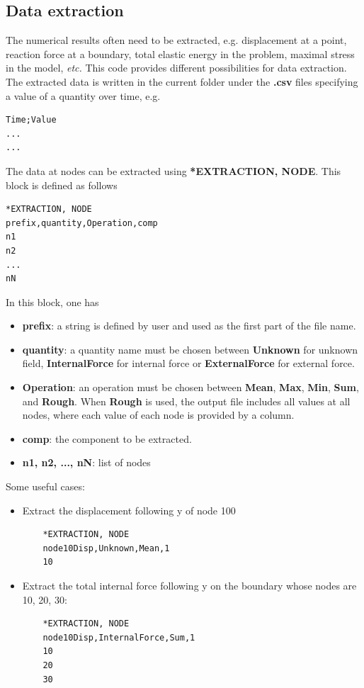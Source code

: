 \documentclass[oneside,11pt,times]{book}
\begin{document}
\subsection{Data extraction}

The numerical results often need to be extracted, e.g. displacement at a point, reaction force at a boundary, total elastic energy in the problem, maximal stress in the model, \emph{etc.} This code provides different possibilities for data extraction. The extracted data is written in the current folder under the \textbf{.csv} files specifying a value of a quantity over time, e.g.
\begin{lstlisting}
Time;Value
...
...
\end{lstlisting}

The data at nodes can be extracted using \textbf{*EXTRACTION, NODE}. This block is defined as follows
\begin{lstlisting}
*EXTRACTION, NODE
prefix,quantity,Operation,comp
n1
n2
...
nN
\end{lstlisting}
In this block, one has
\begin{itemize}
	\item \textbf{prefix}: a string is defined by user and used as the first part of the file name.
	\item \textbf{quantity}: a quantity name must be chosen between \textbf{Unknown} for unknown field, \textbf{InternalForce} for internal force or \textbf{ExternalForce} for external force.
	\item \textbf{Operation}: an operation must be chosen between \textbf{Mean}, \textbf{Max}, \textbf{Min}, \textbf{Sum}, and \textbf{Rough}. When \textbf{Rough} is used, the output file includes all values at all nodes, where each value of each node is provided by a column.
	\item \textbf{comp}: the component to be extracted.
	\item \textbf{n1, n2, ..., nN}: list of nodes
\end{itemize}
Some useful cases:
\begin{itemize}
	\item Extract the displacement following y of node 100
	\begin{lstlisting}
	*EXTRACTION, NODE
	node10Disp,Unknown,Mean,1
	10
	\end{lstlisting}
	\item Extract the total internal force following y on the boundary whose nodes are 10, 20, 30:
	\begin{lstlisting}
	*EXTRACTION, NODE
	node10Disp,InternalForce,Sum,1
	10
	20
	30
	\end{lstlisting}
\end{itemize}
\end{document}
